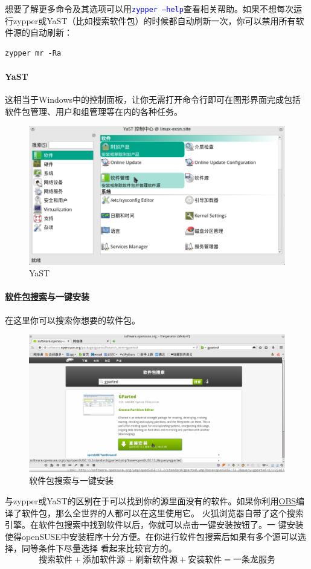 \documentclass[12pt,openany]{book}
\newcommand{\command}[1]{\texttt{\textcolor{blue}{#1}}}
\newcommand{\zy}{zypper或YaST}
\begin{document}
想要了解更多命令及其选项可以用\command{zypper --help}查看相关帮助。如果不想每次运行\zy （比如搜索软件包）的时候都自动刷新一次，你可以禁用所有软件源的自动刷新：
\begin{Verbatim}[formatcom=\color{codecolor}]
    zypper mr -Ra
\end{Verbatim}

\paragraph{YaST} 这相当于Windows中的控制面板，让你无需打开命令行即可在图形界面完成包括软件包管理、用户和组管理等在内的各种任务。
\begin{figure}[htb]
\centering
\includegraphics[width=\textwidth]{./pic/yast.png} 
\caption{YaST}
\end{figure}
\paragraph[软件包搜索与一键安装]{\href{http://software.opensuse.org/packages}{软件包搜索}与一键安装} 在这里你可以搜索你想要的软件包。

\begin{figure}[htb]
\centering
\includegraphics[width=\textwidth]{./pic/software.png} 
\caption{软件包搜索与一键安装}
\end{figure}
与\zy 的区别在于可以找到你的源里面没有的软件。如果你利用\href{https://build.opensuse.org/}{OBS}编译了软件包，那么全世界的人都可以在这里使用它。
火狐浏览器自带了这个搜索引擎。在软件包搜索中找到软件以后，你就可以点击一键安装按钮了。一
键安装使得openSUSE中安装程序十分方便。在你进行软件包搜索后如果有多个源可以选择，同等条件下尽量选择
看起来比较官方的。\[\text{搜索软件}+\text{添加软件源}+\text{刷新软件源}+\text{安装软件}=\text{一条龙服务}\]
\end{document}
